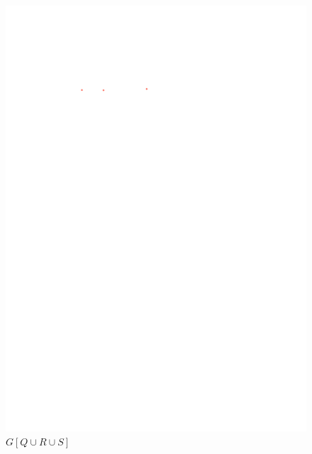 \documentclass[12pt]{article}
\theoremstyle{definition}
\begin{document}
\begin{figure}
  \includegraphics[page=3,trim={0 18 0 10},clip]{figs/bg_layers.pdf} \\
  $G[Q\cup R\cup S]$ \\[2ex]

\end{figure}
\end{document}
